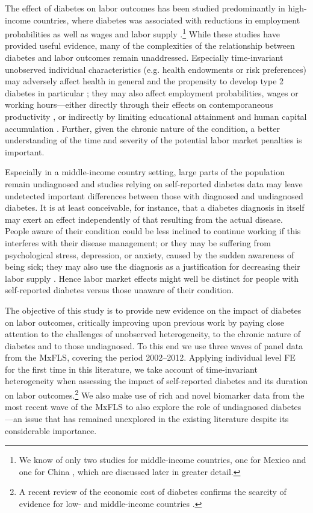 \documentclass[12pt,english]{article}
\begin{document}
The effect of diabetes on labor outcomes has been studied predominantly in high-income countries, where diabetes was associated with reductions in employment probabilities as well as wages and labor supply \parencite{Brown2005,Brown2014,BrownIII2011,Minor2011,Minor2013,Minor2015,Latif2009,Seuring2015a}.\footnote{We know of only two studies for middle-income countries, one for Mexico \parencite{Seuring2015} and one for China \parencite{Liu2014}, which are discussed later in greater detail.} While these studies have provided useful evidence, many of the complexities of the relationship between diabetes and labor outcomes remain unaddressed. Especially time-invariant unobserved individual characteristics (e.g. health endowments or risk preferences) may adversely affect health in general and the propensity to develop type 2 diabetes in particular \parencite{VanEwijk2011,Sotomayor2013,Li2010b}; they may also affect employment probabilities, wages or working hours---either directly through their effects on contemporaneous productivity \parencite{Currie2013}, or indirectly by limiting educational attainment and human capital accumulation \parencite{Ayyagari2011a}. Further, given the chronic nature of the condition, a better understanding of the time and severity of the potential labor market penalties is important. 

Especially in a middle-income country setting, large parts of the population remain undiagnosed \parencite{Beagley2014} and studies relying on self-reported diabetes data may leave undetected important differences between those with diagnosed and undiagnosed diabetes. It is at least conceivable, for instance, that a diabetes diagnosis in itself may exert an effect independently of that resulting from the actual disease. People aware of their condition could be less inclined to continue working if this interferes with their disease management; or they may be suffering from psychological stress, depression, or anxiety, caused by the sudden awareness of being sick; they may also use the diagnosis as a justification for decreasing their labor supply \parencite{Kapteyn2009}. Hence labor market effects might well be distinct for people with self-reported diabetes versus those unaware of their condition.

The objective of this study is to provide new evidence on the impact of diabetes on labor outcomes, critically improving upon previous work by paying close attention to the challenges of unobserved heterogeneity, to the chronic nature of diabetes and to those undiagnosed. To this end we use three waves of panel data from the \acf{MxFLS}, covering the period 2002--2012. Applying individual level \acf{FE} for the first time in this literature, we take account of time-invariant heterogeneity when assessing the impact of self-reported diabetes and its duration on labor outcomes.\footnote{A recent review of the economic cost of diabetes confirms the scarcity of evidence for low- and middle-income countries \parencite{Seuring2015a}.} We also make use of rich and novel biomarker data from the most recent wave of the \ac{MxFLS} to also explore the role of undiagnosed diabetes---an issue that has remained unexplored in the existing literature despite its considerable importance.
\end{document}
